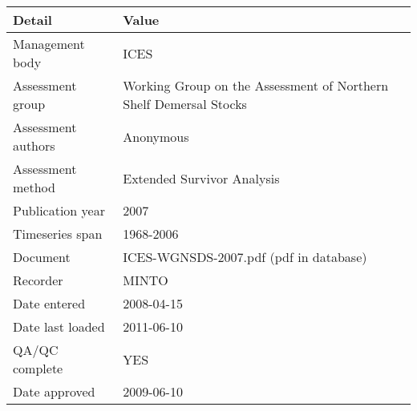 \begin{table}[htb]
\centering
\begin{tabular}{lp{7cm}}
\toprule
Detail & Value \\
\midrule
Management body    & ICES                                                              \\
Assessment group   & Working Group on the Assessment of Northern Shelf Demersal Stocks \\
Assessment authors & Anonymous                                                         \\
Assessment method  & Extended Survivor Analysis                                        \\
Publication year   & 2007                                                              \\
Timeseries span    & 1968-2006                                                         \\
Document           & ICES-WGNSDS-2007.pdf (pdf in database)                            \\
Recorder           & MINTO                                                             \\
Date entered       & 2008-04-15                                                        \\
Date last loaded   & 2011-06-10                                                        \\
QA/QC complete     & YES                                                               \\
Date approved      & 2009-06-10                                                        \\
\bottomrule
\end{tabular}
\label{tab:assessdet}
\end{table}
